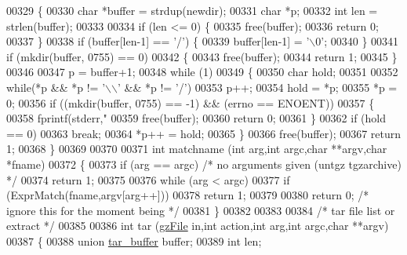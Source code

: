 \begin{DoxyCode}
{{{00329 \{
00330   \textcolor{keywordtype}{char} *buffer = strdup(newdir);
00331   \textcolor{keywordtype}{char} *p;
00332   \textcolor{keywordtype}{int}  len = strlen(buffer);
00333 
00334   \textcolor{keywordflow}{if} (len <= 0) \{
00335     free(buffer);
00336     \textcolor{keywordflow}{return} 0;
00337   \}
00338   \textcolor{keywordflow}{if} (buffer[len-1] == \textcolor{charliteral}{'/'}) \{
00339     buffer[len-1] = \textcolor{charliteral}{'\(\backslash\)0'};
00340   \}
00341   \textcolor{keywordflow}{if} (mkdir(buffer, 0755) == 0)
00342     \{
00343       free(buffer);
00344       \textcolor{keywordflow}{return} 1;
00345     \}
00346 
00347   p = buffer+1;
00348   \textcolor{keywordflow}{while} (1)
00349     \{
00350       \textcolor{keywordtype}{char} hold;
00351 
00352       \textcolor{keywordflow}{while}(*p && *p != \textcolor{charliteral}{'\(\backslash\)\(\backslash\)'} && *p != \textcolor{charliteral}{'/'})
00353         p++;
00354       hold = *p;
00355       *p = 0;
00356       \textcolor{keywordflow}{if} ((mkdir(buffer, 0755) == -1) && (errno == ENOENT))
00357         \{
00358           fprintf(stderr,\textcolor{stringliteral}{"%
00359           free(buffer);
00360           \textcolor{keywordflow}{return} 0;
00361         \}
00362       \textcolor{keywordflow}{if} (hold == 0)
00363         \textcolor{keywordflow}{break};
00364       *p++ = hold;
00365     \}
00366   free(buffer);
00367   \textcolor{keywordflow}{return} 1;
00368 \}
00369 
00370 
00371 \textcolor{keywordtype}{int} matchname (\textcolor{keywordtype}{int} arg,\textcolor{keywordtype}{int} argc,\textcolor{keywordtype}{char} **argv,\textcolor{keywordtype}{char} *fname)
00372 \{
00373   \textcolor{keywordflow}{if} (arg == argc)      \textcolor{comment}{/* no arguments given (untgz tgzarchive) */}
00374     \textcolor{keywordflow}{return} 1;
00375 
00376   \textcolor{keywordflow}{while} (arg < argc)
00377     \textcolor{keywordflow}{if} (ExprMatch(fname,argv[arg++]))
00378       \textcolor{keywordflow}{return} 1;
00379 
00380   \textcolor{keywordflow}{return} 0; \textcolor{comment}{/* ignore this for the moment being */}
00381 \}
00382 
00383 
00384 \textcolor{comment}{/* tar file list or extract */}
00385 
00386 \textcolor{keywordtype}{int} tar (\hyperlink{structgz_file__s}{gzFile} in,\textcolor{keywordtype}{int} action,\textcolor{keywordtype}{int} arg,\textcolor{keywordtype}{int} argc,\textcolor{keywordtype}{char} **argv)
00387 \{
00388   \textcolor{keyword}{union  }\hyperlink{uniontar__buffer}{tar\_buffer} buffer;
00389   \textcolor{keywordtype}{int}    len;
}}}}
\end{DoxyCode}
